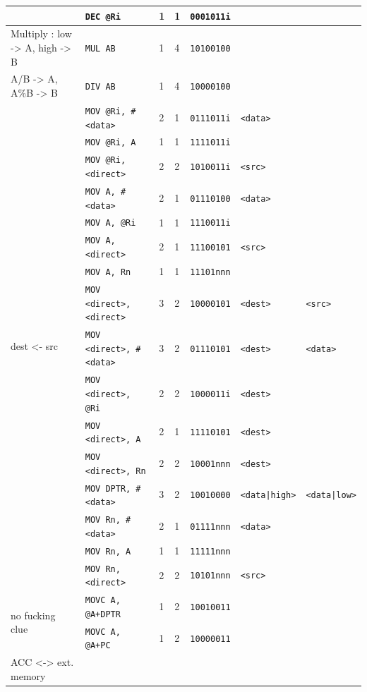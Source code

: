 \documentclass[journal]{IEEEtran}
\begin{document}
{{\begin{tabular}{|l|l|l|l|l|l|l|}
		& \texttt{DEC @Ri} & 1 & 1 & \texttt{0001011i} & & \\
		\hline
		Multiply : low -> A, high -> B
		& \texttt{MUL AB} & 1 & 4 & \texttt{10100100} & & \\
		\hline
		A/B -> A, A\%B -> B
		& \texttt{DIV AB} & 1 & 4 & \texttt{10000100} & & \\
		\hline
		\multirow{16}{*}{dest <- src}
		& \texttt{MOV @Ri, \#<data>} & 2 & 1 & \texttt{0111011i} & \texttt{<data>} & \\
		& \texttt{MOV @Ri, A} & 1 & 1 & \texttt{1111011i} & & \\
		& \texttt{MOV @Ri, <direct>} & 2 & 2 & \texttt{1010011i} & \texttt{<src>} & \\
		& \texttt{MOV A, \#<data>} & 2 & 1 & \texttt{01110100} & \texttt{<data>} & \\ %
		& \texttt{MOV A, @Ri} & 1 & 1 & \texttt{1110011i} & & \\
		& \texttt{MOV A, <direct>} & 2 & 1 & \texttt{11100101} & \texttt{<src>} & \\
		& \texttt{MOV A, Rn} & 1 & 1 & \texttt{11101nnn} & & \\
		& \texttt{MOV <direct>, <direct>} & 3 & 2 & \texttt{10000101} & \texttt{<dest>} & \texttt{<src>} \\
		& \texttt{MOV <direct>, \#<data>} & 3 & 2 & \texttt{01110101} & \texttt{<dest>} & \texttt{<data>} \\
		& \texttt{MOV <direct>, @Ri} & 2 & 2 & \texttt{1000011i} & \texttt{<dest>} & \\
		& \texttt{MOV <direct>, A} & 2 & 1 & \texttt{11110101} & \texttt{<dest>} & \\
		& \texttt{MOV <direct>, Rn} & 2 & 2 & \texttt{10001nnn} & \texttt{<dest>} & \\
		& \texttt{MOV DPTR, \#<data>} & 3 & 2 & \texttt{10010000} & \texttt{<data|high>} & \texttt{<data|low>} \\
		& \texttt{MOV Rn, \#<data>} & 2 & 1 & \texttt{01111nnn} & \texttt{<data>} & \\
		& \texttt{MOV Rn, A} & 1 & 1 & \texttt{11111nnn} & & \\
		& \texttt{MOV Rn, <direct>} & 2 & 2 & \texttt{10101nnn} & \texttt{<src>} & \\
		\hline
		\multirow{2}{*}{no fucking clue}
		& \texttt{MOVC A, @A+DPTR} & 1 & 2 & \texttt{10010011} & & \\
		& \texttt{MOVC A, @A+PC} & 1 & 2 & \texttt{10000011} & & \\
		\hline
		\multirow{3}{*}{ACC <-> ext. memory}

\end{tabular}}}
\end{document}

